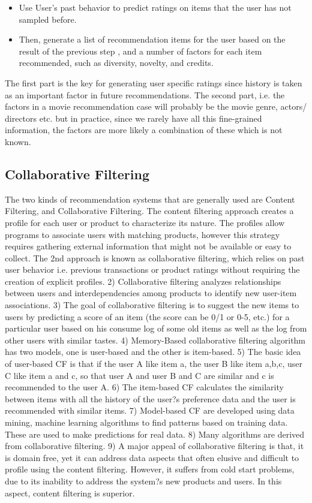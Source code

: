 \documentclass{article} %
\begin{document}
\begin{itemize}

\item  Use User's past behavior to predict ratings on items that the user has not sampled before. 
\item Then, generate a list of recommendation items for the user based on the result of the previous step , and a number of factors for each item recommended, such as diversity, novelty, and credits. 
\end{itemize}

The first part is the key for generating user specific ratings since history is taken as an important factor in future recommendations. The second part, i.e. the factors in a movie recommendation case will probably be the movie genre, actors/ directors etc. but in practice, since we rarely have all this fine-grained information, the factors are more likely a combination of these which is not known. 


\subsection{Collaborative Filtering}

The two kinds of recommendation systems that are generally used are Content Filtering, and Collaborative Filtering. The content filtering approach creates a profile for each user or product to characterize its nature. The profiles allow programs to associate users with matching products, however this strategy requires gathering external information that might not be available or easy to collect. The 2nd approach is known as collaborative filtering, which relies on past user behavior i.e. previous transactions or product ratings without requiring the creation of explicit profiles. 
2)	Collaborative filtering analyzes relationships between users and interdependencies among products to identify new user-item associations.
3)	The goal of collaborative filtering is to suggest the new items to users by predicting a score of an item (the score can be 0/1 or 0-5, etc.) for a particular user based on his consume log of some old items as well as the log from other users with similar tastes.
4)	Memory-Based collaborative filtering algorithm has two models, one is user-based and the other is item-based.
5)	The basic idea of user-based CF is that if the user A like item a, the user B like item a,b,c, user C like item a and c, so that user A and user B and C are similar and c is recommended to the user A.
6)	The item-based CF calculates the similarity between items with all the history of the user?s preference data and the user is recommended with similar items.
7)	Model-based CF are developed using data mining, machine learning algorithms to find patterns based on training data. These are used to make predictions for real data.
8)	Many algorithms are derived from collaborative filtering.
9)	A major appeal of collaborative filtering is that, it is domain free, yet it can address data aspects that often elusive and difficult to profile using the content filtering. However, it suffers from cold start problems, due to its inability to address the system?s new products and users. In this aspect, content filtering is superior.
\end{document}
